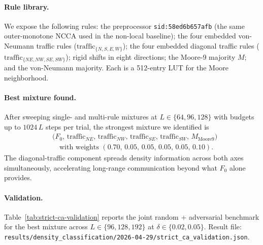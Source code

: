 \documentclass[11pt,a4paper]{article}
\newcommand{\sid}[1]{\texttt{sid:}\allowbreak\texttt{#1}}
\newcommand{\fpath}[1]{\nolinkurl{#1}}
\begin{document}
\paragraph{Rule library.}  We expose the following rules: the
preprocessor \sid{58ed6b657afb} (the same outer-monotone NCCA used in
the non-local baseline); the four embedded von-Neumann traffic rules
(\(\mathrm{traffic}_{\{N,S,E,W\}}\)); the four embedded diagonal traffic
rules (\(\mathrm{traffic}_{\{NE,NW,SE,SW\}}\)); rigid shifts in eight
directions; the Moore-9 majority \(M\); and the von-Neumann majority.
Each is a 512-entry LUT for the Moore neighborhood.

\paragraph{Best mixture found.}  After sweeping single- and
multi-rule mixtures at \(L \in \{64, 96, 128\}\) with budgets up to
\(1024\,L\) steps per trial, the strongest mixture we identified is
\[
\begin{aligned}
&\bigl(F_0,\,\mathrm{traffic}_{NE},\,\mathrm{traffic}_{NW},\,
       \mathrm{traffic}_{SE},\,\mathrm{traffic}_{SW},\,M_{\mathrm{Moore9}}\bigr) \\
&\quad\text{with weights }(0.70,\,0.05,\,0.05,\,0.05,\,0.05,\,0.10).
\end{aligned}
\]
The diagonal-traffic component spreads density information across both
axes simultaneously, accelerating long-range communication beyond what
\(F_0\) alone provides.

\paragraph{Validation.}  Table~\ref{tab:strict-ca-validation} reports the
joint random + adversarial benchmark for the best mixture across
\(L \in \{96, 128, 192\}\) at \(\delta \in \{0.02, 0.05\}\).  Result file:
\fpath{results/density_classification/2026-04-29/strict_ca_validation.json}.
\end{document}
